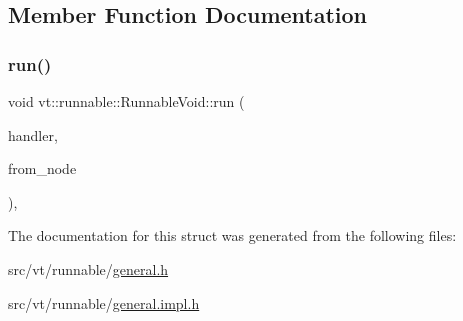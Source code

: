 \subsection{Member Function Documentation}
\mbox{\label{structvt_1_1runnable_1_1_runnable_void_a96cf878b2fac0bfc8625c4b9aa1051c8}} 
\subsubsection{\texorpdfstring{run()}{run()}}
{\footnotesize\ttfamily void vt\+::runnable\+::\+Runnable\+Void\+::run (\begin{DoxyParamCaption}\item[{\hyperlink{namespacevt_af64846b57dfcaf104da3ef6967917573}{Handler\+Type}}]{handler,  }\item[{\hyperlink{namespacevt_a866da9d0efc19c0a1ce79e9e492f47e2}{Node\+Type}}]{from\+\_\+node }\end{DoxyParamCaption})\hspace{0.3cm}{\ttfamily [inline]}, {\ttfamily [static]}}



The documentation for this struct was generated from the following files\+:\begin{DoxyCompactItemize}
\item 
src/vt/runnable/\hyperlink{general_8h}{general.\+h}\item 
src/vt/runnable/\hyperlink{general_8impl_8h}{general.\+impl.\+h}\end{DoxyCompactItemize}
